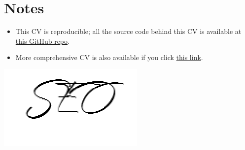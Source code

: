 \documentclass[11pt, a4paper]{awesome-cv}
\begin{document}
\hypertarget{notes}{%
\section{Notes}\label{notes}}

\begin{itemize}
\item
  This CV is reproducible; all the source code behind this CV is
  available at \href{https://github.com/jooyoungseo/jy_CV}{this GitHub
  repo}.
\item
  More comprehensive CV is also available if you click
  \href{https://jooyoungseo.github.io/jy_CV/JooYoung_Seo_CV.pdf}{this
  link}.
\end{itemize}

\includegraphics{../data/signature.png}\\
\end{document}
